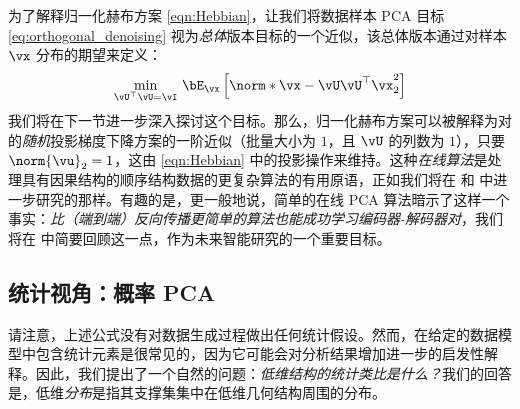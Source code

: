\documentclass[../../book-main_zh.tex]{subfiles}
\begin{document}
为了解释归一化赫布方案 \eqref{eqn:Hebbian}，让我们将数据样本 PCA 目标
\eqref{eq:orthogonal_denoising} 视为\textit{总体}版本目标的一个近似，该总体版本通过对样本
$\vx$ 分布的期望来定义：
\begin{equation}\label{eq:pca-reconstruction-expectation}
    \min_{\vU^\top \vU = \vI}\, \bE_{\vx}\left[\norm*{\vx
    - \vU\vU^\top \vx}_2^2\right]
\end{equation}
我们将在下一节进一步深入探讨这个目标。那么，归一化赫布方案可以被解释为对
的\textit{随机}投影梯度下降方案的一阶近似（批量大小为 $1$，且 $\vU$ 的列数为 $1$），只要
$\norm{\vu}_2 = 1$，这由 \eqref{eqn:Hebbian}
中的投影操作来维持。这种\textit{在线算法}是处理具有因果结构的顺序结构数据的更复杂算法的有用原语，正如我们将在
 和 
中进一步研究的那样。有趣的是，更一般地说，简单的在线 PCA
算法暗示了这样一个事实：\textit{比（端到端）反向传播更简单的算法也能成功学习编码器-解码器对}，我们将在
 中简要回顾这一点，作为未来智能研究的一个重要目标。

\subsection{统计视角：概率 PCA}\label{subsec:probabilistic PCA}

请注意，上述公式没有对数据生成过程做出任何统计假设。然而，在给定的数据模型中包含统计元素是很常见的，因为它可能会对分析结果增加进一步的启发性解释。因此，我们提出了一个自然的问题：\textit{低维结构的统计类比是什么？}我们的回答是，低维\textit{分布}是指其支撑集集中在低维几何结构周围的分布。
\end{document}
